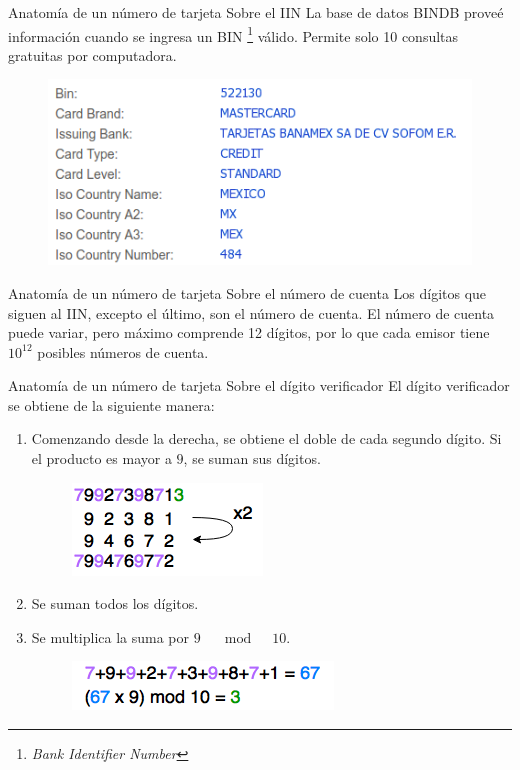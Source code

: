 \begin{frame}{Anatomía de un número de tarjeta}
  {Sobre el IIN}
  La base de datos BINDB proveé información cuando se ingresa un BIN
  \footnote{\textit{Bank Identifier Number}} válido.
  Permite solo 10 consultas gratuitas por computadora.
  \begin{figure}[H]
    \begin{center}
      \includegraphics[width=0.75\linewidth]{diagramas/bindb.png}
    \end{center}
  \end{figure}
\end{frame}

\begin{frame}{Anatomía de un número de tarjeta}
  {Sobre el número de cuenta}
  Los dígitos que siguen al IIN, excepto el último, son el número de cuenta.
  El número de cuenta puede variar, pero máximo comprende 12 dígitos, por lo que
  cada emisor tiene $10^{12}$ posibles números de cuenta.
\end{frame}

\begin{frame}{Anatomía de un número de tarjeta}
  {Sobre el dígito verificador}
  El dígito verificador se obtiene de la siguiente manera:
  \begin{enumerate}
    \item Comenzando desde la derecha, se obtiene el doble de cada segundo
      dígito. Si el producto es mayor a $9$, se suman sus dígitos.
      \begin{figure}[H]
        \begin{center}
          \includegraphics[width=0.4\linewidth]{diagramas/luhn_1.png}
        \end{center}
      \end{figure}
    \item Se suman todos los dígitos.
    \item Se multiplica la suma por $9 \quad \mod \quad 10$.
      \begin{figure}[H]
        \begin{center}
          \includegraphics[width=0.5\linewidth]{diagramas/luhn_2.png}
        \end{center}
      \end{figure}
  \end{enumerate}
\end{frame}